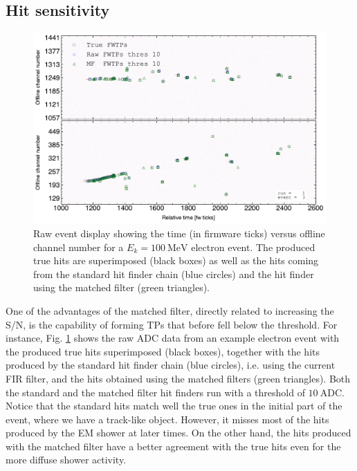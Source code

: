 \subsection{Hit sensitivity}
\label{subsec:2.5.3}

\begin{figure}
	\centering
	\includegraphics[width=0.9\linewidth]{Images/Matched_Filter/electron_k100_full_run_1_evt_3}
	\caption[Raw event display for an electron event showing the true, standard, and matched filter hits produced.]{Raw event display showing the time (in firmware ticks) versus offline channel number for a $E_{k} = 100 \ \mathrm{MeV}$ electron event. The produced true hits are superimposed (black boxes) as well as the hits coming from the standard hit finder chain (blue circles) and the hit finder using the matched filter (green triangles).}
	\label{fig:evthitcomp}
\end{figure}

One of the advantages of the matched filter, directly related to increasing the S/N, is the capability of forming TPs that before fell below the threshold. For instance, Fig. \ref{fig:evthitcomp} shows the raw ADC data from an example electron event with the produced true hits superimposed (black boxes), together with the hits produced by the standard hit finder chain (blue circles), i.e. using the current FIR filter, and the hits obtained using the matched filters (green triangles). Both the standard and the matched filter hit finders run with a threshold of $10 \ \mathrm{ADC}$. Notice that the standard hits match well the true ones in the initial part of the event, where we have a track-like object. However, it misses most of the hits produced by the EM shower at later times. On the other hand, the hits produced with the matched filter have a better agreement with the true hits even for the more diffuse shower activity.

